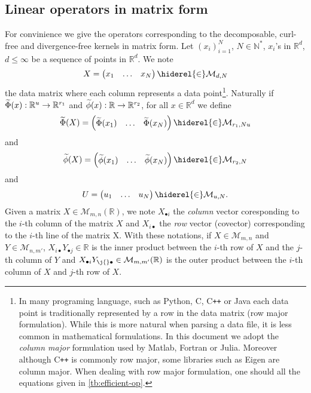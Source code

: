 \subsection{Linear operators in matrix form}
For convinience we give the operators corresponding to the decomposable, curl-free and divergence-free kernels in matrix form. Let $(x_i)_{i=1}^N$, $N\in\mathbb{N}^*$, $x_i$'s in $\mathbb{R}^d$, $d\le\infty$ be a sequence of points in $\mathbb{R}^d$. We note
\begin{dmath*}
X=\begin{pmatrix}x_1 & \hdots & x_N\end{pmatrix}\hiderel{\in}\mathcal{M}_{d,N}
\end{dmath*}
the data matrix where each column represents a data point\footnote{In many programing language, such as Python, C, C{}\verb!++! or Java each data point is traditionally represented by a row in the data matrix (row major formulation). While this is more natural when parsing a data file, it is less common in mathematical formulations. In this document we adopt the \emph{column major} formulation used by Matlab, Fortran or Julia. Moreover although C{}\verb!++! is commonly row major, some libraries such as Eigen are column major. When dealing with row major formulation, one should  all the equations given in \cref{tb:efficient-op}.}. Naturally if $\widetilde{\Phi}(x):\mathbb{R}^u\to\mathbb{R}^{r_1}$ and $\widetilde{\phi}(x):\mathbb{R}\to\mathbb{R}^{r_2}$, for all $x\in\mathbb{R}^d$ we define
\begin{dmath*}
\tildePhi{\omega}(X)=\begin{pmatrix}\tildePhi{\omega}(x_1) & \hdots & \tildePhi{\omega}(x_N)\end{pmatrix}\hiderel{\in}\mathcal{M}_{r_1,Nu}
\end{dmath*}
and
\begin{dmath*}
\tildephi{\omega}(X)=\begin{pmatrix}\tildephi{\omega}(x_1) & \hdots & \tildephi{\omega}(x_N)\end{pmatrix}\hiderel{\in}\mathcal{M}_{r_2, N}
\end{dmath*}
and
\begin{dmath*}
U=\begin{pmatrix} u_1 & \hdots&  u_N \end{pmatrix}\hiderel{\in}\mathcal{M}_{u, N}.
\end{dmath*}
Given a matrix $X\in\mathcal{M}_{m,n}(\mathbb{R})$, we note $X_{\bullet i}$ the \emph{column} vector coresponding to the $i$-th column of the matrix $X$ and $X_{i \bullet}$ the \emph{row} vector (covector) corresponding to the $i$-th line of the matrix X. With these notations, if $X\in\mathcal{M}_{m,n}$ and $Y\in\mathcal{M}_{n,m'}$, $X_{i\bullet}Y_{\bullet j}\in\mathbb{R}$ is the inner product between the $i$-th row of $X$ and the $j$-th column of $Y$ and $X_{\bullet i} Y_{\j{}  \bullet}\in\mathcal{M}_{m,m'}(\mathbb{R})$ is the outer product between the $i$-th column of $X$ and $j$-th row of $X$.
